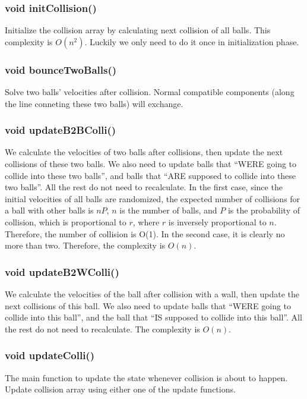 \documentclass[twoside,11pt]{article}
\begin{document}
\subsubsection{void initCollision()}
Initialize the collision array by calculating next collision of all balls. This complexity is $O(n^2)$. Luckily we only need to do it once in initialization phase. 

\subsubsection{void bounceTwoBalls()}
Solve two balls' velocities after collision. Normal compatible components (along the line conneting these two balls) will exchange. 

\subsubsection{void updateB2BColli()}
We calculate the velocities of two balls after collisions, then update the next collisions of these two balls. We also need to update balls that ``WERE going to collide into these two balls'', and balls that ``ARE supposed to collide into these two balls''. All the rest do not need to recalculate. In the first case, since the initial velocities of all balls are randomized, the expected number of collisions for a ball with other balls is $nP$, $n$ is the number of balls, and $P$ is the probability of collision, which is proportional to $r$, where $r$ is inversely proportional to $n$. Therefore, the number of collision is O(1). In the second case, it is clearly no more than two. Therefore, the complexity is $O(n)$.

\subsubsection{void updateB2WColli()}
We calculate the velocities of the ball after collision with a wall, then update the next collisions of this ball. We also need to update balls that ``WERE going to collide into this ball'', and the ball that ``IS supposed to collide into this ball''. All the rest do not need to recalculate. The complexity is $O(n)$.

\subsubsection{void updateColli()}
The main function to update the state whenever collision is about to happen. Update collision array using either one of the update functions.
\end{document}
